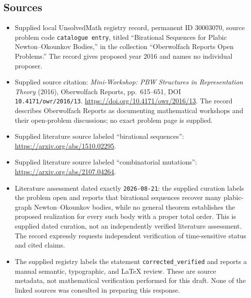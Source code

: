 \documentclass[11pt]{article}
\begin{document}
\subsection{Sources}
\begin{itemize}
\item Supplied local UnsolvedMath registry record, permanent ID \(30003070\), source problem code \texttt{catalogue entry}, titled ``Birational Sequences for Plabic Newton--Okounkov Bodies,'' in the collection ``Oberwolfach Reports Open Problems.'' The record gives proposed year 2016 and names no individual proposer.
\item Supplied source citation: \emph{Mini-Workshop: PBW Structures in Representation Theory} (2016), Oberwolfach Reports, pp.~615--651, DOI \texttt{10.4171/owr/2016/13}. \url{https://doi.org/10.4171/owr/2016/13}. The record describes Oberwolfach Reports as documenting mathematical workshops and their open-problem discussions; no exact problem page is supplied.
\item Supplied literature source labeled ``birational sequences'': \url{https://arxiv.org/abs/1510.02295}.
\item Supplied literature source labeled ``combinatorial mutations'': \url{https://arxiv.org/abs/2107.04264}.
\item Literature assessment dated exactly \texttt{2026-08-21}: the supplied curation labels the problem open and reports that birational sequences recover many plabic-graph Newton--Okounkov bodies, while no general theorem establishes the proposed realization for every such body with a proper total order. This is supplied dated curation, not an independently verified literature assessment. The record expressly requests independent verification of time-sensitive status and cited claims.
\item The supplied registry labels the statement \texttt{corrected\_verified} and reports a manual semantic, typographic, and LaTeX review. These are source metadata, not mathematical verification performed for this draft. None of the linked sources was consulted in preparing this response.
\end{itemize}
\end{document}
